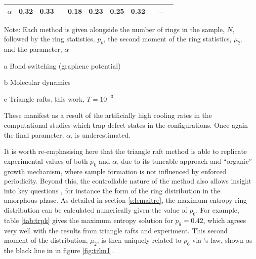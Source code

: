\begin{landscape}
\begin{table}
\begin{threeparttable}
\begin{tabular}{@{}ccccccccccc@{}}
$\alpha$  &0.32   & 0.33 && 0.18 & 0.23 & 0.25 & 0.32 && \--- \\
\bottomrule
\end{tabular}
\begin{tablenotes}
  Note: Each method is given alongside the number of rings in the sample, $N$, followed by the ring statistics, $p_k$, the second moment of the ring statistics, $\mu_2$, and the \aw{} parameter, $\alpha$ \\
  \item[a] Bond switching \mc{} (graphene potential)
  \item[b] Molecular dynamics
  \item[c] Triangle rafts, this work, $T=10^{-3}$
\end{tablenotes}
\end{threeparttable}
\end{table}
\end{landscape}

\noindent These manifest as a result of the artificially high cooling rates in the computational studies which trap defect states in the configurations. 
Once again the final \aw{} parameter, $\alpha$, is underestimated.

It is worth re\--emphasising here that the triangle raft method is able to replicate experimental values of both $p_k$ and $\alpha$, due to its tuneable approach and ``organic'' growth mechanism, where sample formation is not influenced by enforced periodicity. 
Beyond this, the controllable nature of the method also allows insight into key questions%
, for instance the form of the ring distribution in the amorphous phase. 
As detailed in section \ref{s:lemaitre}, the maximum entropy ring distribution can be calculated numerically given the value of $p_6$.
For example, table \ref{tab:trpk} gives the maximum entropy solution for $p_6=0.42$, which agrees very well with the results from triangle rafts and experiment.
This second moment of the distribution, $\mu_2$, is then uniquely related to $p_6$ via \lm's law, shown as the black line in in figure \ref{fig:trlm1}.


